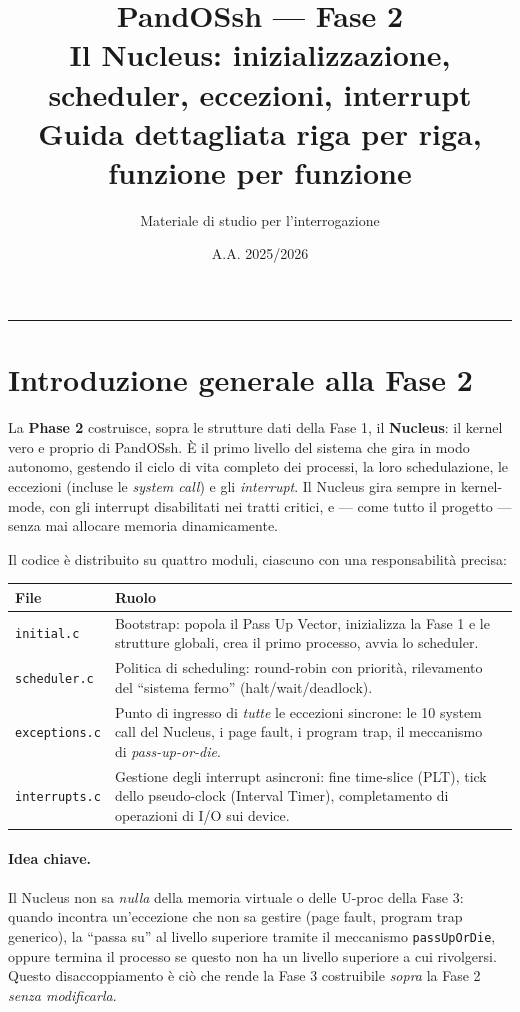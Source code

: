 \documentclass[11pt,a4paper]{article}
\title{\textbf{PandOSsh --- Fase 2}\\[2pt]
\large Il Nucleus: inizializzazione, scheduler, eccezioni, interrupt\\
\normalsize Guida dettagliata riga per riga, funzione per funzione}
\author{Materiale di studio per l'interrogazione}
\date{A.A. 2025/2026}
\newcommand{\code}[1]{\texttt{#1}}
\begin{document}
\maketitle
\tableofcontents
\bigskip
\hrule
\bigskip

\section{Introduzione generale alla Fase 2}

La \textbf{Phase 2} costruisce, sopra le strutture dati della Fase 1, il
\textbf{Nucleus}: il kernel vero e proprio di PandOSsh. È il primo livello
del sistema che gira in modo autonomo, gestendo il ciclo di vita completo dei
processi, la loro schedulazione, le eccezioni (incluse le \emph{system
call}) e gli \emph{interrupt}. Il Nucleus gira sempre in kernel-mode, con
gli interrupt disabilitati nei tratti critici, e --- come tutto il progetto
--- senza mai allocare memoria dinamicamente.

Il codice è distribuito su quattro moduli, ciascuno con una responsabilità
precisa:
\begin{center}
\begin{tabular}{@{}llp{7.7cm}@{}}
\toprule
\textbf{File} & \textbf{Ruolo} \\
\midrule
\code{initial.c} & Bootstrap: popola il Pass Up Vector, inizializza la Fase 1
  e le strutture globali, crea il primo processo, avvia lo scheduler. \\
\code{scheduler.c} & Politica di scheduling: round-robin con priorità,
  rilevamento del ``sistema fermo'' (halt/wait/deadlock). \\
\code{exceptions.c} & Punto di ingresso di \emph{tutte} le eccezioni
  sincrone: le 10 system call del Nucleus, i page fault, i program trap, il
  meccanismo di \emph{pass-up-or-die}. \\
\code{interrupts.c} & Gestione degli interrupt asincroni: fine time-slice
  (PLT), tick dello pseudo-clock (Interval Timer), completamento di
  operazioni di I/O sui device. \\
\bottomrule
\end{tabular}
\end{center}

\paragraph{Idea chiave.} Il Nucleus non sa \emph{nulla} della memoria
virtuale o delle U-proc della Fase 3: quando incontra un'eccezione che non
sa gestire (page fault, program trap generico), la ``passa su'' al livello
superiore tramite il meccanismo \code{passUpOrDie}, oppure termina il
processo se questo non ha un livello superiore a cui rivolgersi. Questo
disaccoppiamento è ciò che rende la Fase 3 costruibile \emph{sopra} la Fase
2 \emph{senza modificarla}.
\end{document}
